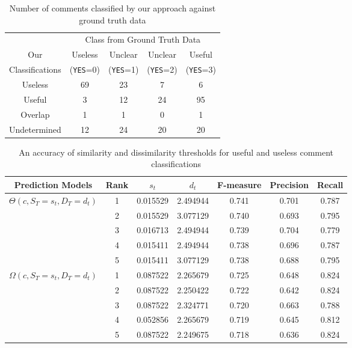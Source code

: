 \begin{table}[h]
\centering
\small
\caption{Number of comments classified by our approach against ground truth data}
\begin{tabular}{ccccc}
\hline
& \multicolumn{4}{c}{Class from Ground Truth Data} \\ \cline{2-5}
Our&  Useless  & Unclear  & Unclear & Useful \\
Classifications&  (\texttt{YES}=0) & (\texttt{YES}=1) & (\texttt{YES}=2) & (\texttt{YES}=3) \\
\hline \hline
Useless & 69 & 23 & 7 & 6 \\
Useful & 3 & 12 & 24 & 95 \\
Overlap & 1 & 1 & 0 & 1 \\
Undetermined & 12 & 24 & 20 & 20 \\
\hline
\end{tabular}
\label{tb:classify_number}
\end{table}


\begin{table*}[!t]
\caption{An accuracy of similarity and dissimilarity thresholds for useful and useless comment classifications}
\small
\centering
\def\arraystretch{1.2}
\begin{tabular}{ccccccc}
\hline
Prediction Models  & Rank & $s_t$ & $d_t$ & F-measure & Precision & Recall \\ \hline \hline
\multirow{5}{*}{$\Theta(c,S_T=s_t,D_T=d_t)$}
& 1 & 0.015529 & 2.494944 & 0.741 & 0.701 & 0.787 \\ \cline{2-7}
& 2 & 0.015529 & 3.077129 & 0.740 & 0.693 & 0.795 \\ \cline{2-7}
& 3 & 0.016713 & 2.494944 & 0.739 & 0.704 & 0.779 \\ \cline{2-7}
& 4 & 0.015411 & 2.494944 & 0.738 & 0.696 & 0.787 \\ \cline{2-7}
& 5 & 0.015411 & 3.077129 & 0.738 & 0.688 & 0.795
\\ \hline \hline
\multirow{5}{*}{$\Omega(c,S_T=s_t,D_T=d_t)$}
& 1 & 0.087522 & 2.265679 & 0.725 & 0.648 & 0.824 \\ \cline{2-7}
& 2 & 0.087522 & 2.250422 & 0.722 & 0.642 & 0.824 \\ \cline{2-7}
& 3 & 0.087522 & 2.324771 & 0.720 & 0.663 & 0.788 \\ \cline{2-7}
& 4 & 0.052856 & 2.265679 & 0.719 & 0.645 & 0.812 \\ \cline{2-7}
& 5 & 0.087522 & 2.249675 & 0.718 & 0.636 & 0.824
\\ \hline
\end{tabular}
\label{tb:thresholds}
\end{table*}

